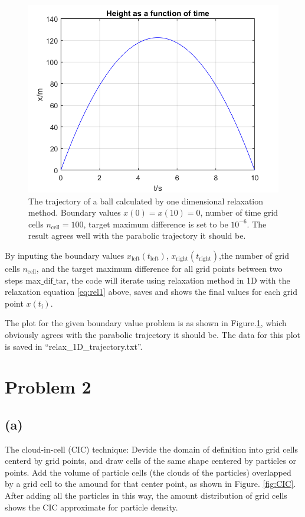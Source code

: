 \documentclass[12pt, graphicx]{article}
\begin{document}
\begin{figure}[ht]
\centering
\includegraphics[width = 120mm]{trajectory.png}
\caption{The trajectory of a ball calculated by one dimensional relaxation method. Boundary values $x(0)=x(10)=0$, number of time grid cells $n_\mathrm{cell}=100$, target maximum difference is set to be $10^{-6}$. The result agrees well with the parabolic trajectory it should be.}
\label{fig:trajectory}
\end{figure}

By inputing the boundary values $x_\mathrm{left}(t_\mathrm{left})$, $x_\mathrm{right}(t_\mathrm{right})$,the number of grid cells $n_\mathrm{cell}$, and the target maximum difference for all grid points between two steps $\mathrm{max\_dif\_tar}$, the code will iterate using relaxation method in 1D with the relaxation equation \ref{eq:rel1} above, saves and shows the final values for each grid point $x(t_\mathrm{i})$.\par
The plot for the given boundary value problem is as shown in Figure.\ref{fig:trajectory}, which obviously agrees with the parabolic trajectory it should be. The data for this plot is saved in \textquotedblleft relax\_1D\_trajectory.txt\textquotedblright.

\section*{Problem 2}
\subsection*{(a)}
The cloud-in-cell (CIC) technique: Devide the domain of definition into grid cells centerd by grid points, and draw cells of the same shape centered by particles or points. Add the volume of particle cells (the clouds of the particles) overlapped by a grid cell to the amound for that center point, as shown in Figure. \ref{fig:CIC}. After adding all the particles in this way, the amount distribution of grid cells shows the CIC approximate for particle density.\par
\end{document}
